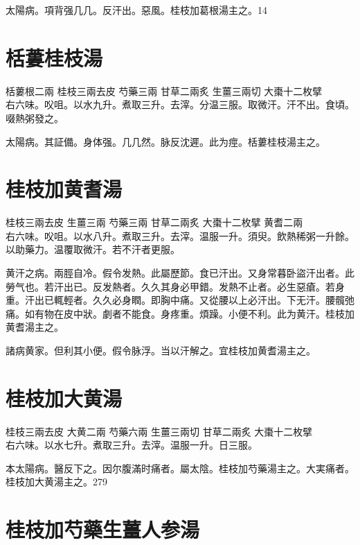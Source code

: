 太陽病。項背强几几。反汗出。惡風。桂枝{\khaaitp 加葛根}湯主之。14

\section{栝蔞桂枝湯}

栝蔞根{\scriptsize 二兩} 桂枝{\scriptsize 三兩去皮} 芍藥{\scriptsize 三兩} 甘草{\scriptsize 二兩炙} 生薑{\scriptsize 三兩切} 大棗{\scriptsize 十二枚擘}\\
右六味。㕮咀。以水九升。煮取三升。去滓。分温三服。取微汗。汗不出。食頃。啜熱粥發之。

太陽病。其証備。身体强。几几然。脉反沈遲。此为痙。栝蔞桂枝湯主之。

\section{桂枝加黄耆湯}

桂枝{\scriptsize 三兩去皮} 生薑{\scriptsize 三兩} 芍藥{\scriptsize 三兩} 甘草{\scriptsize 二兩炙} 大棗{\scriptsize 十二枚擘} 黄耆{\scriptsize 二兩}\\
右六味。㕮咀。以水八升。煮取三升。去滓。温服一升。須臾。飲熱稀粥一升餘。以助藥力。温覆取微汗。若不汗者更服。

黄汗之病。兩脛自冷。假令发熱。此屬歷節。食已汗出。又身常暮{\khaaitp 卧}盜汗出者。此勞气也。若汗出已。反发熱者。久久其身必甲錯。发熱不止者。必生惡瘡。若身重。汗出已輒輕者。久久必身瞤。即胸中痛。又從腰以上必汗出。下无汗。腰髖弛痛。如有物在皮中狀。劇者不能食。身疼重。煩躁。小便不利。此为黄汗。桂枝加黄耆湯主之。

諸病黄家。但利其小便。假令脉浮。当以汗解之。宜桂枝加黄耆湯主之。

\section{桂枝加大黄湯}

桂枝{\scriptsize 三兩去皮} 大黄{\scriptsize 二兩} 芍藥{\scriptsize 六兩} 生薑{\scriptsize 三兩切} 甘草{\scriptsize 二兩炙} 大棗{\scriptsize 十二枚擘}\\
右六味。以水七升。煮取三升。去滓。温服一升。日三服。

{\khaaitp 本}太陽病。醫反下之。因尔腹滿时痛者。屬太陰。桂枝加芍藥湯主之。大実痛者。桂枝加大黄湯主之。279

\section{桂枝加芍藥生薑人参湯}

